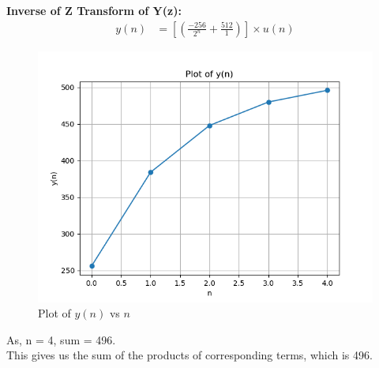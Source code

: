 \documentclass[journal,12pt,twocolumn]{IEEEtran}
\theoremstyle{remark}
\begin{document}
\textbf{Inverse of Z Transform of Y(z):} \\
\begin{align}
y(n) &= \left[(\frac{-256}{2^{n}} + \frac{512}{1})\right] \times u(n)
\end{align}
\begin{figure}[h!]
    \centering
    \includegraphics[width=\columnwidth]{figs/yn.png}
    \caption{Plot of $y(n)$ vs $n$}
    \label{fig:1}
\end{figure}
As, n = 4, sum = 496. \\
This gives us the sum of the products of corresponding terms, which is 496.
\end{document}
